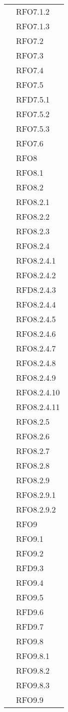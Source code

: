 \begin{longtable}{ p{12cm} | p{4cm} }
	& RFO7.1.2 \\
	& RFO7.1.3 \\
	& RFO7.2 \\
	& RFO7.3 \\
	& RFO7.4 \\
	& RFO7.5 \\
	& RFD7.5.1 \\
	& RFO7.5.2 \\
	& RFO7.5.3 \\
	& RFO7.6 \\
	& RFO8 \\
	& RFO8.1 \\
	& RFO8.2 \\
	& RFO8.2.1 \\
	& RFO8.2.2 \\
	& RFO8.2.3 \\
	& RFO8.2.4 \\
	& RFO8.2.4.1 \\
	& RFO8.2.4.2 \\
	& RFD8.2.4.3 \\
	& RFO8.2.4.4 \\
	& RFO8.2.4.5 \\
	& RFO8.2.4.6 \\
	& RFO8.2.4.7 \\
	& RFO8.2.4.8 \\
	& RFO8.2.4.9 \\
	& RFO8.2.4.10 \\
	& RFO8.2.4.11 \\
	& RFO8.2.5 \\
	& RFO8.2.6 \\
	& RFO8.2.7 \\
	& RFO8.2.8 \\
	& RFO8.2.9 \\
	& RFO8.2.9.1 \\
	& RFO8.2.9.2 \\
	& RFO9 \\
	& RFO9.1 \\
	& RFO9.2 \\
	& RFD9.3 \\
	& RFO9.4 \\
	& RFO9.5 \\
	& RFD9.6 \\
	& RFD9.7 \\
	& RFO9.8 \\
	& RFO9.8.1 \\
	& RFO9.8.2 \\
	& RFO9.8.3 \\
	& RFO9.9 \\

\end{longtable}
